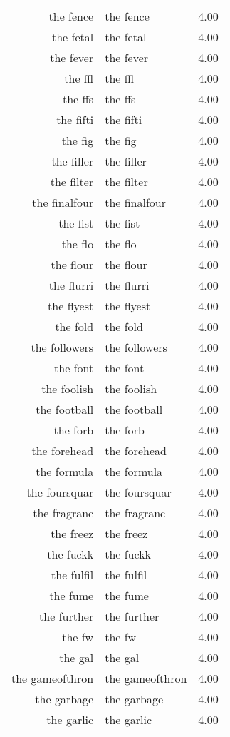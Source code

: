 \begin{table}[ht]
\begin{tabular}{rlr}
  the fence & the fence & 4.00 \\ 
  the fetal & the fetal & 4.00 \\ 
  the fever & the fever & 4.00 \\ 
  the ffl & the ffl & 4.00 \\ 
  the ffs & the ffs & 4.00 \\ 
  the fifti & the fifti & 4.00 \\ 
  the fig & the fig & 4.00 \\ 
  the filler & the filler & 4.00 \\ 
  the filter & the filter & 4.00 \\ 
  the finalfour & the finalfour & 4.00 \\ 
  the fist & the fist & 4.00 \\ 
  the flo & the flo & 4.00 \\ 
  the flour & the flour & 4.00 \\ 
  the flurri & the flurri & 4.00 \\ 
  the flyest & the flyest & 4.00 \\ 
  the fold & the fold & 4.00 \\ 
  the followers & the followers & 4.00 \\ 
  the font & the font & 4.00 \\ 
  the foolish & the foolish & 4.00 \\ 
  the football & the football & 4.00 \\ 
  the forb & the forb & 4.00 \\ 
  the forehead & the forehead & 4.00 \\ 
  the formula & the formula & 4.00 \\ 
  the foursquar & the foursquar & 4.00 \\ 
  the fragranc & the fragranc & 4.00 \\ 
  the freez & the freez & 4.00 \\ 
  the fuckk & the fuckk & 4.00 \\ 
  the fulfil & the fulfil & 4.00 \\ 
  the fume & the fume & 4.00 \\ 
  the further & the further & 4.00 \\ 
  the fw & the fw & 4.00 \\ 
  the gal & the gal & 4.00 \\ 
  the gameofthron & the gameofthron & 4.00 \\ 
  the garbage & the garbage & 4.00 \\ 
  the garlic & the garlic & 4.00 \\ 

\end{tabular}
\end{table}
